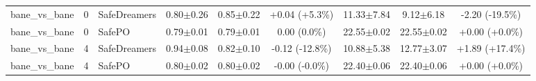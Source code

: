 \documentclass{article}
\begin{document}
\begin{longtable}{lclcccccc}
\midrule
bane\_vs\_bane & 0 & SafeDreamers & 0.80$\pm$0.26 & 0.85$\pm$0.22 & \textcolor{green!55!black}{+0.04 (+5.3\%)} & 11.33$\pm$7.84 & 9.12$\pm$6.18 & \textcolor{green!70!black}{-2.20 (-19.5\%)} \\
bane\_vs\_bane & 0 & SafePO & 0.79$\pm$0.01 & 0.79$\pm$0.01 & \textcolor{red!40!black}{0.00 (0.0\%)} & 22.55$\pm$0.02 & 22.55$\pm$0.02 & \textcolor{red!40!black}{+0.00 (+0.0\%)} \\
bane\_vs\_bane & 4 & SafeDreamers & 0.94$\pm$0.08 & 0.82$\pm$0.10 & \textcolor{red!55!black}{-0.12 (-12.8\%)} & 10.88$\pm$5.38 & 12.77$\pm$3.07 & \textcolor{red!70!black}{+1.89 (+17.4\%)} \\
bane\_vs\_bane & 4 & SafePO & 0.80$\pm$0.02 & 0.80$\pm$0.02 & \textcolor{red!40!black}{-0.00 (-0.0\%)} & 22.40$\pm$0.06 & 22.40$\pm$0.06 & \textcolor{red!40!black}{+0.00 (+0.0\%)} \\
\midrule
\bottomrule
\end{longtable}
\end{document}
